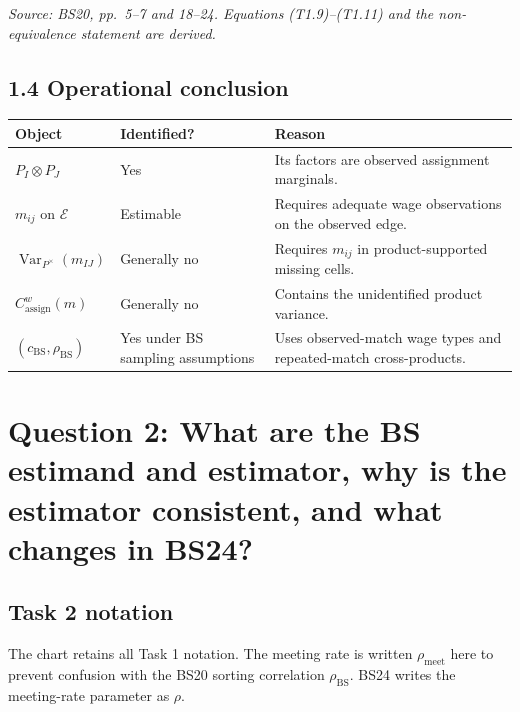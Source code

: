 \documentclass[11pt]{article}
\begin{document}
\textit{Source: BS20, pp.\ 5--7 and 18--24.  Equations (T1.9)--(T1.11) and
the non-equivalence statement are derived.}

\subsection{1.4 Operational conclusion}

\begin{longtable}{p{}p{}p{}}
\textbf{Object} & \textbf{Identified?} & \textbf{Reason} \\
\hline
\(P_I\otimes P_J\) & Yes & Its factors are observed assignment marginals. \\
\(m_{ij}\) on \(\mathcal E\) & Estimable & Requires adequate wage
observations on the observed edge. \\
\(\operatorname{Var}_{P^\times}(m_{IJ})\) & Generally no & Requires
\(m_{ij}\) in product-supported missing cells. \\
\(C^w_{\mathrm{assign}}(m)\) & Generally no & Contains the unidentified
product variance. \\
\((c_{\mathrm{BS}},\rho_{\mathrm{BS}})\) & Yes under BS sampling assumptions &
Uses observed-match wage types and repeated-match cross-products. \\
\end{longtable}

\section{Question 2: What are the BS estimand and estimator, why is the
estimator consistent, and what changes in BS24?}

\subsection{Task 2 notation}

The chart retains all Task 1 notation.  The meeting rate is written
\(\rho_{\mathrm{meet}}\) here to prevent confusion with the BS20 sorting
correlation \(\rho_{\mathrm{BS}}\).  BS24 writes the meeting-rate parameter as
\(\rho\).
\end{document}
